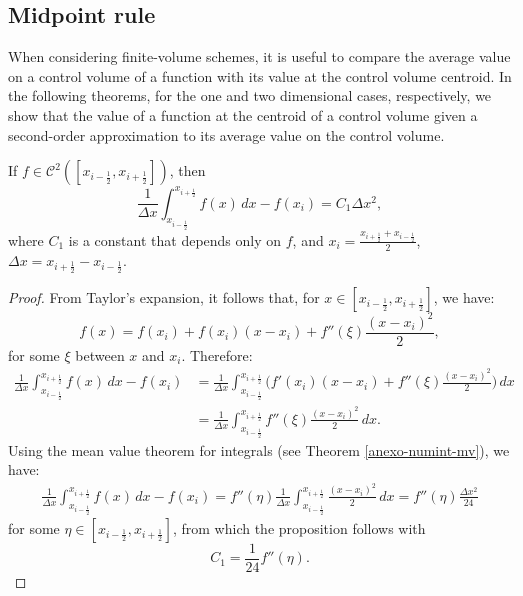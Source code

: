 \subsection{Midpoint rule}
When considering finite-volume schemes, it is useful to compare the average value on a  control volume 
of a function with its value at the  control volume centroid. 
In the following theorems, for the one and two dimensional cases, respectively,
we show that the value of a function at the centroid of a control volume given a second-order approximation to its average value
on the control volume.
\begin{thrm}
	\label{prop-bound-midpoint1d}
	If $f \in \mathcal{C}^2([x_{i-\frac{1}{2}},x_{i+\frac{1}{2}}])$, then 
	\begin{equation}
		\frac{1}{\Delta x}\int_{x_{i-\frac{1}{2}}}^{x_{i+\frac{1}{2}}}{f(x)\,dx}-f(x_i) = C_1 \Delta x^2, 
	\end{equation}
	where $C_1$ is a constant that depends only on $f$, and $x_i = \frac{x_{i+\frac{1}{2}} + x_{i-\frac{1}{2}}}{2}$,
	$\Delta x = x_{i+\frac{1}{2}}-x_{i-\frac{1}{2}}$.
\end{thrm}
\begin{proof}
	From Taylor's expansion, it follows that, for $x \in [x_{i-\frac{1}{2}},x_{i+\frac{1}{2}}]$, we have:
	\begin{equation}
		f(x) = f(x_i) +  f(x_i)(x-x_i) + f''(\xi)\frac{(x-x_i)^2}{2},
	\end{equation}
	for some $\xi$ between $x$ and $x_i$. Therefore:
	\begin{align*}
		\frac{1}{\Delta x} \int_{x_{i-\frac{1}{2}}}^{x_{i+\frac{1}{2}}} {f(x)\,dx} - f(x_i)  
		&= \frac{1}{\Delta x} \int_{x_{i-\frac{1}{2}}}^{x_{i+\frac{1}{2}}} 
		\bigg( f'(x_i)(x-x_i) + f''(\xi)\frac{(x-x_i)^2}{2} \bigg) \,dx \\ 
		&=  \frac{1}{\Delta x} \int_{x_{i-\frac{1}{2}}}^{x_{i+\frac{1}{2}}} 
		f''(\xi)\frac{(x-x_i)^2}{2}  \,dx.
	\end{align*}
	Using the mean value theorem for integrals (see Theorem \ref{anexo-numint-mv}), we have:
	\begin{align*}
		\frac{1}{\Delta x} \int_{x_{i-\frac{1}{2}}}^{x_{i+\frac{1}{2}}} {f(x)\,dx} - f(x_i)  = 
		f''(\eta) \frac{1}{\Delta x} \int_{x_{i-\frac{1}{2}}}^{x_{i+\frac{1}{2}}} 
		\frac{(x-x_i)^2}{2}  \,dx = f''(\eta)\frac{\Delta x^2}{24}
	\end{align*}	
	for some $\eta \in [x_{i-\frac{1}{2}},x_{i+\frac{1}{2}}]$, from which the proposition follows with
	\begin{equation}
		C_1 = \frac{1}{24}f''(\eta).
	\end{equation}
\end{proof}

